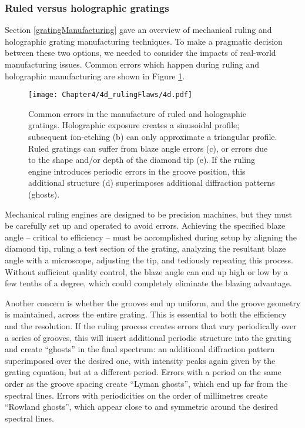 \subsubsection{Ruled versus holographic gratings}
Section \ref{gratingManufacturing} gave an overview of mechanical ruling and holographic grating manufacturing techniques.  To make a pragmatic decision between these two options, we needed to consider the impacts of real-world manufacturing issues.  Common errors which happen during ruling and holographic manufacturing are shown in Figure \ref{4d}.

\begin{figure}[htbp] %
   \centering
   \texttt{[image: Chapter4/4d\_rulingFlaws/4d.pdf]} 
   \caption[Common errors in the manufacture of ruled and holographic gratings.]{Common errors in the manufacture of ruled and holographic gratings.  Holographic exposure creates a sinusoidal profile; subsequent ion-etching (b) can only approximate a triangular profile.  Ruled gratings can suffer from blaze angle errors (c), or errors due to the shape and/or depth of the diamond tip (e).  If the ruling engine introduces periodic errors in the groove position, this additional structure (d) superimposes additional diffraction patterns (ghosts).}
   \label{4d}
\end{figure}

Mechanical ruling engines are designed to be precision machines, but they must be carefully set up and operated to avoid errors.  Achieving the specified blaze angle -- critical to efficiency -- must be accomplished during setup by aligning the diamond tip, ruling a test section of the grating, analyzing the resultant blaze angle with a microscope, adjusting the tip, and tediously repeating this process.  Without sufficient quality control, the blaze angle can end up high or low by a few tenths of a degree, which could completely eliminate the blazing advantage.

Another concern is whether the grooves end up uniform, and the groove geometry is maintained, across the entire grating.  This is essential to both the efficiency and the resolution.  If the ruling process creates errors that vary periodically over a series of grooves, this will insert additional periodic structure into the grating and create ``ghosts'' in the final spectrum: an additional diffraction pattern superimposed over the desired one, with intensity peaks again given by the grating equation, but at a different period.  Errors with a period on the same order as the groove spacing create ``Lyman ghosts'', which end up far from the spectral lines.  Errors with periodicities on the order of millimetres create ``Rowland ghosts'', which appear close to and symmetric around the desired spectral lines.

